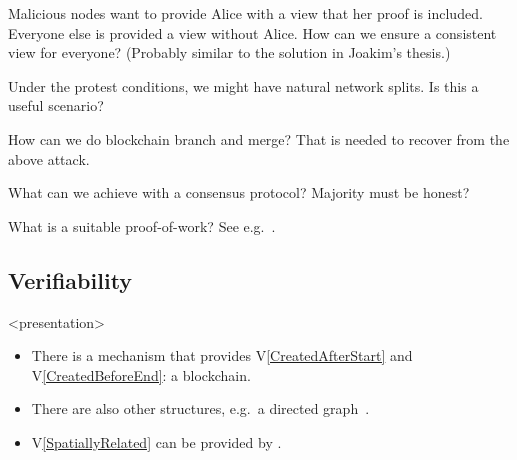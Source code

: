 \begin{frame}
  \begin{question}
    Malicious nodes want to provide Alice with a view that her proof is 
    included.
    Everyone else is provided a view without Alice.
    How can we ensure a consistent view for everyone?
    (Probably similar to the solution in Joakim's thesis.)
  \end{question}

  \begin{question}
    Under the protest conditions, we might have natural network splits.
    Is this a useful scenario?
  \end{question}

  \begin{question}
    How can we do blockchain branch and merge?
    That is needed to recover from the above attack.
  \end{question}
\end{frame}

\begin{frame}
  \begin{question}
    What can we achieve with a consensus protocol?
    Majority must be honest?
  \end{question}
  \begin{question}
    What is a suitable proof-of-work?
    See e.g.~\cite{FairProofOfWork}.
  \end{question}
\end{frame}

\subsection{Verifiability}

\begin{frame}<presentation>
\begin{idea}
  \begin{itemize}
    \item There is a mechanism that provides V\ref{CreatedAfterStart} and 
      V\ref{CreatedBeforeEnd}: a blockchain.

    \item There are also other structures, e.g.\ a directed 
      graph~\cite{BlockchainFreeCryptocurrencies}.

      \pause

    \item V\ref{SpatiallyRelated} can be provided by .
  \end{itemize}
\end{idea}
\end{frame}

